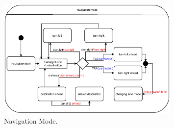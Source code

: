 \documentclass[12pt]{article}
\begin{document}
\begin{spacing}{1.5}
\begin{figure}[h!]
	\centering
		\includegraphics[width=0.8\textwidth]{./A2_Figures/A2_SOEN331_Navigation.eps}
		  \caption{Navigation Mode.}
  \label{fig:navigation-mode-fig}
\end{figure}

\end{spacing}
\end{document}
